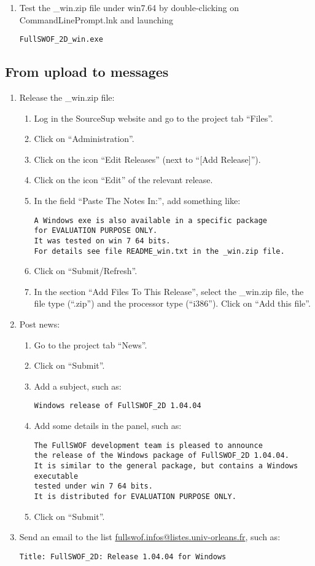 \documentclass[a4paper, 11pt]{article}
\begin{document}
\begin{enumerate}
\item Test the \_win.zip file under win7.64 by
double-clicking on CommandLinePrompt.lnk and launching
\begin{verbatim}
FullSWOF_2D_win.exe
\end{verbatim}
\end{enumerate}

\subsection{From upload to messages}
\begin{enumerate}
\item Release the \_win.zip file:
\begin{enumerate}
\item Log in the SourceSup website and go to the project tab ``Files''.
\item Click on ``Administration''.
\item Click on the icon ``Edit Releases'' (next to ``[Add Release]'').
\item Click on the icon ``Edit'' of the relevant release.
\item In the field ``Paste The Notes In:'', add something like:
\begin{verbatim}
A Windows exe is also available in a specific package 
for EVALUATION PURPOSE ONLY.
It was tested on win 7 64 bits.
For details see file README_win.txt in the _win.zip file.
\end{verbatim}
\item Click on ``Submit/Refresh''.
\item In the section ``Add Files To This Release'', select the \_win.zip file,
the file type (``.zip'') and the processor type  (``i386''). Click on ``Add this file''.
\end{enumerate}
\item Post news:
\begin{enumerate}
\item Go to the project tab ``News''.
\item Click on ``Submit''.
\item Add a subject, such as:
\begin{verbatim}
Windows release of FullSWOF_2D 1.04.04
\end{verbatim}
\item Add some details in the panel, such as:
\begin{verbatim}
The FullSWOF development team is pleased to announce
the release of the Windows package of FullSWOF_2D 1.04.04.
It is similar to the general package, but contains a Windows executable 
tested under win 7 64 bits.
It is distributed for EVALUATION PURPOSE ONLY.
\end{verbatim}
\item Click on ``Submit''.
\end{enumerate}
\item Send an email to the list
\href{mailto:fullswof.infos@listes.univ-orleans.fr}{fullswof.infos@listes.univ-orleans.fr}, such as:
\begin{verbatim}
Title: FullSWOF_2D: Release 1.04.04 for Windows


\end{verbatim}
\end{enumerate}
\end{document}
